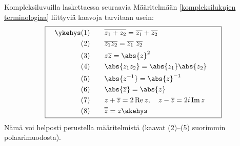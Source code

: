 Kompleksiluvuilla laskettaessa seuraavia Määritelmään \ref{kompleksilukujen terminologiaa} 
liittyviä kaavoja tarvitaan usein:
\[ \boxed{ \begin{aligned}
\quad\ykehys &\text{(1)} \qquad \overline{z_1+z_2} = \overline{z_1} + \overline{z_2} \\
             &\text{(2)} \qquad \overline{z_1z_2} = \overline{z_1}\,\,\overline{z_2} \\
             &\text{(3)} \qquad z \overline{z} = \abs{z}^2 \\
             &\text{(4)} \qquad \abs{z_1z_2} = \abs{z_1} \abs{z_2} \\
             &\text{(5)} \qquad \abs{z^{-1}} = \abs{z}^{-1} \\
             &\text{(6)} \qquad \abs{\overline{z}} = \abs{z} \\
             &\text{(7)} \qquad z+\overline{z} = 2\,\text{Re} \, z, \quad z-\overline{z} 
                                               = 2i\,\text{Im} \, z \qquad\\
             &\text{(8)} \qquad \overline{\overline{z}} = z \akehys
           \end{aligned} } \]
Nämä voi helposti perustella määritelmistä (kaavat (2)--(5) suorimmin polaarimuodosta). 

